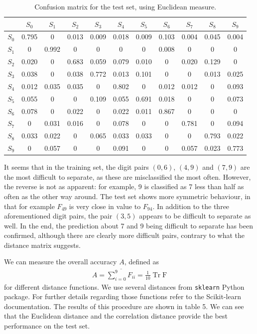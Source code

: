 \documentclass[11pt]{article}
\DeclareMathOperator{\Tr}{Tr}
\begin{document}
\begin{table}
\centering
\small
\begin{tabular}{c|cccccccccc}
&$S_0$&$S_1$&$S_2$&$S_3$&$S_4$&$S_5$&$S_6$&$S_7$&$S_8$&$S_9$\\\hline
$S_0$&0.795&0&0.013&0.009&0.018&0.009&0.103&0.004&0.045&0.004\\
$S_1$&0&0.992&0&0&0&0&0.008&0&0&0\\
$S_2$&0.020&0&0.683&0.059&0.079&0.010&0&0.020&0.129&0\\
$S_3$&0.038&0&0.038&0.772&0.013&0.101&0&0&0.013&0.025\\
$S_4$&0.012&0.035&0.035&0&0.802&0&0.012&0.012&0&0.093\\
$S_5$&0.055&0&0&0.109&0.055&0.691&0.018&0&0&0.073\\
$S_6$&0.078&0&0.022&0&0.022&0.011&0.867&0&0&0\\
$S_7$&0&0.031&0.016&0&0.078&0&0&0.781&0&0.094\\
$S_8$&0.033&0.022&0&0.065&0.033&0.033&0&0&0.793&0.022\\
$S_9$&0&0.057&0&0&0.091&0&0&0.057&0.023&0.773
\end{tabular}
\caption{Confusion matrix for the test set, using Euclidean measure.}
\normalsize
\end{table}
It seems that in the training set, the digit pairs $(0, 6)$, $(4, 9)$ and $(7, 9)$ are the most difficult to separate, as these are misclassified the most often. However, the reverse is not as apparent: for example, 9 is classified as 7 less than half as often as the other way around. The test set shows more symmetric behaviour, in that for example $F_{49}$ is very close in value to $F_{94}$. In addition to the three aforementioned digit pairs, the pair $(3, 5)$ appears to be difficult to separate as well. In the end, the prediction about 7 and 9 being difficult to separate has been confirmed, although there are clearly more difficult pairs, contrary to what the distance matrix suggests.\par
We can measure the overall accuracy $A$, defined as
\begin{align}
A=\overline{\sum_{i=0}^9F_{ii}}=\frac{1}{10}\Tr\mathrm{F}
\end{align}
for different distance functions. We use several distances from \verb|sklearn| Python package. For further details regarding those functions refer to the Scikit-learn documentation\cite{scikit}. The results of this procedure are shown in table 5. We can see that the Euclidean distance and the correlation distance provide the best performance on the test set.
\end{document}
